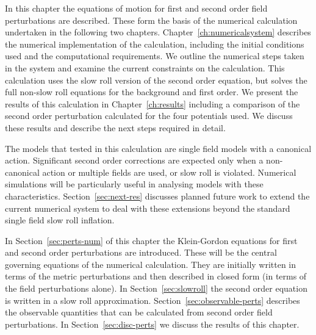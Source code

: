 In this chapter the equations of motion for first and second order field
perturbations are described. These form the basis of the numerical calculation
undertaken in the following two chapters.
Chapter~\ref{ch:numericalsystem} describes the numerical implementation of the
calculation, including the initial conditions used and the
computational requirements. We outline the numerical steps
taken in the system and examine the current constraints
on the calculation. This calculation uses the slow roll version of the second
order equation, but solves the full non-slow roll equations for the
background and first order.
% 
We present the results of this calculation
in Chapter~\ref{ch:results} including a comparison of the second
order perturbation calculated for the four potentials used. We discuss
these results and describe the next steps required in detail.

%
% 
The models that tested in this calculation are single field models with a canonical
action. Significant second order corrections
are expected only when a non-canonical action or multiple fields are
used, or slow roll is violated. Numerical simulations will be particularly
useful in analysing models with these characteristics.
Section~\ref{sec:next-res} discusses planned future work to extend the current
numerical system to deal with these extensions beyond the standard single field slow
roll inflation.


In Section~\ref{sec:perts-num} of this chapter the Klein-Gordon equations
for first and second order perturbations are introduced. These will be the central
governing equations of the numerical calculation. They are
initially written in
terms of the metric perturbations and
then described in closed form (\ie in terms of the field perturbations alone). In
Section~\ref{sec:slowroll} the second order equation is written in a slow roll
approximation.
% 
Section~\ref{sec:observable-perts} describes the observable quantities that can be
calculated from second order field perturbations. In Section~\ref{sec:disc-perts} we
discuss the results of this chapter.




